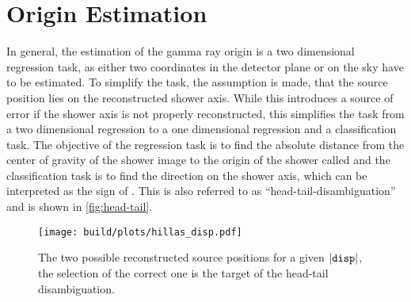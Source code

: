 \section{Origin Estimation}\label{sec:origin}

In general, the estimation of the gamma ray origin is a two dimensional regression
task, as either two coordinates in the detector plane or on the sky
have to be estimated. 
To simplify the task, the assumption is made, that the source position lies
on the reconstructed shower axis. 
While this introduces a source of error if the shower axis is not properly reconstructed,
this simplifies the task from a two dimensional regression to a one dimensional regression
and a classification task.
The objective of the regression task is to find the absolute distance from the
center of gravity of the shower image to the origin of the shower called  and the
classification task is to find the direction on the shower axis, which can be
interpreted as the sign of . 
This is also referred to as \enquote{head-tail-disambiguation} and is shown in \autoref{fig:head-tail}.

\begin{figure}
  \centering
  \texttt{[image: build/plots/hillas\_disp.pdf]}
  \caption{%
    The two possible reconstructed source positions for a given $\vert\mathtt{disp}\vert$,
    the selection of the correct one is the target of the head-tail disambiguation.
  }\label{fig:head-tail}
\end{figure}

